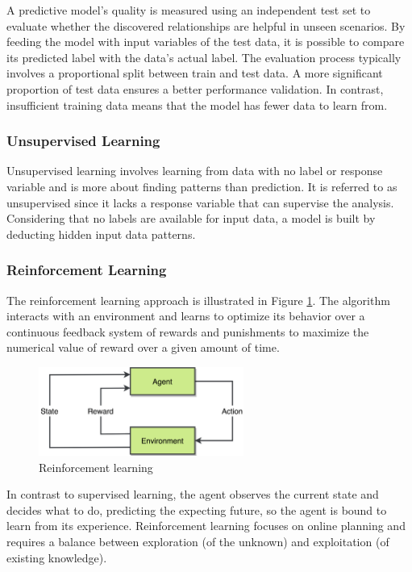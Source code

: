 A predictive model's quality is measured using an independent test set to evaluate whether the discovered relationships are helpful in unseen scenarios. By feeding the model with input variables of the test data, it is possible to compare its predicted label with the data's actual label. The evaluation process typically involves a proportional split between train and test data. A more significant proportion of test data ensures a better performance validation. In contrast, insufficient training data means that the model has fewer data to learn from.

\subsubsection{Unsupervised Learning}

Unsupervised learning involves learning from data with no label or response variable and is more about finding patterns than prediction. It is referred to as unsupervised since it lacks a response variable that can supervise the analysis. Considering that no labels are available for input data, a model is built by deducting hidden input data patterns.

\subsubsection{Reinforcement Learning}

The reinforcement learning approach is illustrated in Figure \ref{fig:reinforcement_learning}. The algorithm interacts with an environment and learns to optimize its behavior over a continuous feedback system of rewards and punishments to maximize the numerical value of reward over a given amount of time.

\begin{figure}[H]
\centering
\includegraphics[width=0.6\textwidth]{img/state_of_the_art/reinforcement_learning.png}
\caption{Reinforcement learning}
\label{fig:reinforcement_learning}
\end{figure}

In contrast to supervised learning, the agent observes the current state and decides what to do, predicting the expecting future, so the agent is bound to learn from its experience. Reinforcement learning focuses on online planning and requires a balance between exploration (of the unknown) and exploitation (of existing knowledge).

